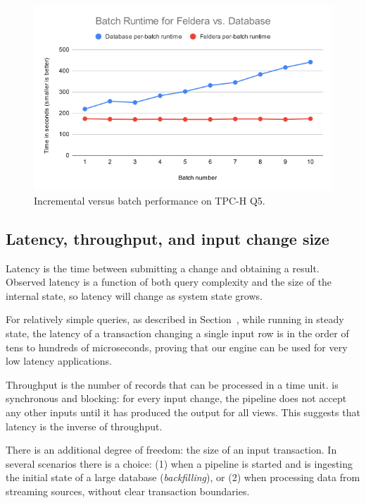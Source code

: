 \begin{figure}[t]
  \begin{center}
  \includegraphics[scale=.4]{graph/tpch}
  \caption{Incremental versus batch performance on TPC-H
    Q5\label{fig:tpch}.}
  \end{center}
\end{figure}

\vspace{-3ex}
\subsection{Latency, throughput, and input change size}

Latency is the time between submitting a change and obtaining a
result.  Observed latency is a function of both query complexity and
the size of the internal state, so latency will change as system
state grows.

For relatively simple queries, as described in
Section~, while running in steady state,
the latency of a transaction changing a single input row is in the
order of tens to hundreds of microseconds, proving that our engine can
be used for very low latency applications.

Throughput is the number of records that can be processed in a time
unit.  \dbsp is synchronous and blocking: for every input
change, the pipeline does not accept any other inputs until it has
produced the output for all views.  This suggests that latency is the
inverse of throughput.

There is an additional degree of freedom: the size of an input
transaction.  In several scenarios there is a choice: (1) when a
pipeline is started and is ingesting the initial state of a large
database (\emph{backfilling}), or (2) when processing data from
streaming sources, without clear transaction boundaries.

